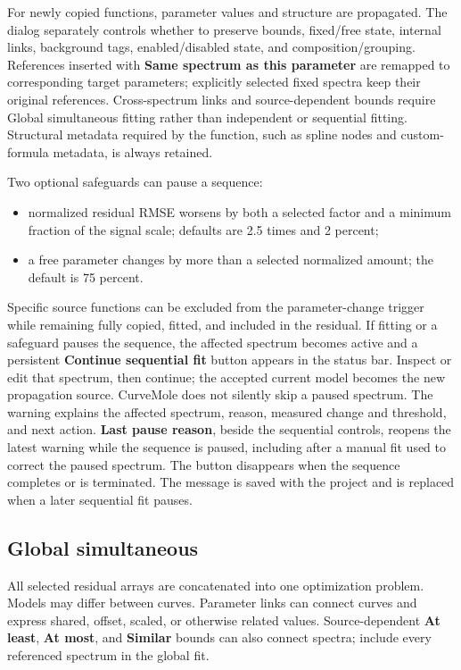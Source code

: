 \documentclass[
  10pt,
  a4paper,
  oneside]{scrreprt}
\providecommand{\tightlist}{%
  \setlength{\itemsep}{0pt}\setlength{\parskip}{0pt}}
\begin{document}
For newly copied functions, parameter values and structure are
propagated. The dialog separately controls whether to preserve bounds,
fixed/free state, internal links, background tags, enabled/disabled
state, and composition/grouping. References inserted with \textbf{Same
spectrum as this parameter} are remapped to corresponding target
parameters; explicitly selected fixed spectra keep their original
references. Cross-spectrum links and source-dependent bounds require
Global simultaneous fitting rather than independent or sequential
fitting. Structural metadata required by the function, such as spline
nodes and custom-formula metadata, is always retained.

Two optional safeguards can pause a sequence:

\begin{itemize}
\tightlist
\item
  normalized residual RMSE worsens by both a selected factor and a
  minimum fraction of the signal scale; defaults are 2.5 times and 2
  percent;
\item
  a free parameter changes by more than a selected normalized amount;
  the default is 75 percent.
\end{itemize}

Specific source functions can be excluded from the parameter-change
trigger while remaining fully copied, fitted, and included in the
residual. If fitting or a safeguard pauses the sequence, the affected
spectrum becomes active and a persistent \textbf{Continue sequential
fit} button appears in the status bar. Inspect or edit that spectrum,
then continue; the accepted current model becomes the new propagation
source. CurveMole does not silently skip a paused spectrum. The warning
explains the affected spectrum, reason, measured change and threshold,
and next action. \textbf{Last pause reason}, beside the sequential
controls, reopens the latest warning while the sequence is paused,
including after a manual fit used to correct the paused spectrum. The
button disappears when the sequence completes or is terminated. The
message is saved with the project and is replaced when a later
sequential fit pauses.

\hypertarget{global-simultaneous}{%
\subsection{Global simultaneous}\label{global-simultaneous}}

All selected residual arrays are concatenated into one optimization
problem. Models may differ between curves. Parameter links can connect
curves and express shared, offset, scaled, or otherwise related values.
Source-dependent \textbf{At least}, \textbf{At most}, and
\textbf{Similar} bounds can also connect spectra; include every
referenced spectrum in the global fit.
\end{document}
